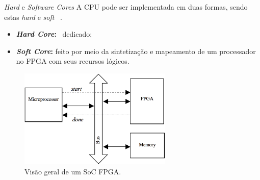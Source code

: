   \begin{frame}{\textit{Hard} e \textit{Software Cores}} \vspace{-1em}
      A CPU pode ser implementada em duas formas, sendo estas \textit{hard} e \textit{soft} \cores\ \cite{Plessl2003}. 
      \begin{itemize}
         \setlength{\itemsep}{0.5em}
         \item \textbf{\textit{Hard Core}:} \core\ dedicado;
         \item \textbf{\textit{Soft Core}:} feito por meio da sintetização e mapeamento de um processador no FPGA com seus recursos lógicos. 
      \end{itemize}
   
      \begin{figure}[h] \centering
         \vspace{-8pt}
         \includegraphics[width=0.65\textwidth]{img/into-soc.png}
         \caption{Visão geral de um SoC FPGA.}
         \label{fig:rb-soc}
      \end{figure}
   
   \end{frame}

